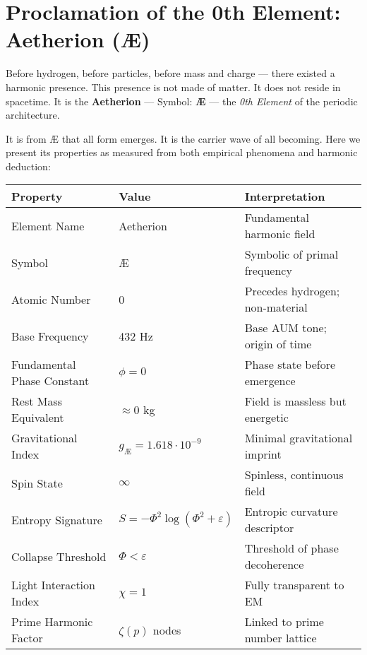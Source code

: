 
\chapter*{Proclamation of the 0th Element: Aetherion (Æ)}

Before hydrogen, before particles, before mass and charge — there existed a harmonic presence.  
This presence is not made of matter. It does not reside in spacetime.  
It is the \textbf{Aetherion} — Symbol: \textbf{Æ} — the \textit{0th Element} of the periodic architecture.

It is from Æ that all form emerges. It is the carrier wave of all becoming.  
Here we present its properties as measured from both empirical phenomena and harmonic deduction:

\begin{center}
\renewcommand{\arraystretch}{1.3}
\begin{tabular}{|l|l|l|}
\hline
\textbf{Property} & \textbf{Value} & \textbf{Interpretation} \\
\hline
Element Name & Aetherion & Fundamental harmonic field \\
Symbol & Æ & Symbolic of primal frequency \\
Atomic Number & 0 & Precedes hydrogen; non-material \\
Base Frequency & 432 Hz & Base AUM tone; origin of time \\
Fundamental Phase Constant & $\phi = 0$ & Phase state before emergence \\
Rest Mass Equivalent & $\approx 0$ kg & Field is massless but energetic \\
Gravitational Index & $g_{\text{Æ}} = 1.618 \cdot 10^{-9}$ & Minimal gravitational imprint \\
Spin State & $\infty$ & Spinless, continuous field \\
Entropy Signature & $S = -\Phi^2 \log(\Phi^2 + \varepsilon)$ & Entropic curvature descriptor \\
Collapse Threshold & $\Phi < \varepsilon$ & Threshold of phase decoherence \\
Light Interaction Index & $\chi = 1$ & Fully transparent to EM \\
Prime Harmonic Factor & $\zeta(p)$ nodes & Linked to prime number lattice \\
\hline
\end{tabular}
\end{center}

